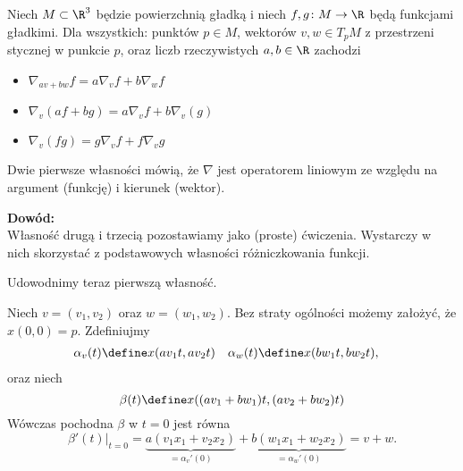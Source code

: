 \begin{frame}[<+->]

\begin{lemat}\label{lem:wl-pochodnej-kierunkowej}
Niech $M\subset \R^3$ będzie powierzchnią gładką i niech $f,g\colon M\to \R$ będą funkcjami gładkimi. Dla wszystkich: punktów $p\in M$, wektorów $v,w\in T_pM$ z przestrzeni stycznej w punkcie $p$, oraz liczb rzeczywistych $a,b\in \R$ zachodzi
\begin{itemize}
\item $\nabla_{av+bw}f=a\nabla_v f+b\nabla_w f$
\item $\nabla_v(af+bg)=a\nabla_v f+b\nabla_v(g)$
\item $\nabla_v(fg)=g\nabla_vf+f\nabla_vg$
\end{itemize}
\end{lemat}
\begin{uwaga}
Dwie pierwsze własności mówią, że $\nabla$ jest operatorem liniowym ze względu na argument (funkcję) i kierunek (wektor).
\end{uwaga}

\end{frame}
\begin{frame}[<+->]

\textcolor{ared}{\textbf{Dowód:}}\\\pause 
Własność drugą i trzecią pozostawiamy jako (proste) ćwiczenia. Wystarczy w nich skorzystać z podstawowych własności różniczkowania funkcji.

Udowodnimy teraz pierwszą własność. 

\pause Niech $v=(v_1, v_2)$ oraz $w=(w_1,w_2)$. Bez straty ogólności możemy założyć, że $x(0,0)=p$. \pause Zdefiniujmy 
\begin{align*}
\alpha_v(t)\define&{x(av_1t,av_2t)}& \alpha_w(t)\define &x(bw_1t,bw_2t),
\end{align*}
oraz niech
\[\beta(t)\define x((av_1+bw_1)t,(av_2+bw_2)t)\] %
\pause Wówczas pochodna $\beta$ w $t=0$ jest równa 
\[\beta'(t)\big|_{t=0}=
\underbrace{a(v_1x_1+v_2x_2)}_{=\alpha_v'(0)}+\underbrace{b(w_1x_1+w_2x_2)}_{=\alpha_w'(0)}=v+w.\]

\end{frame}
